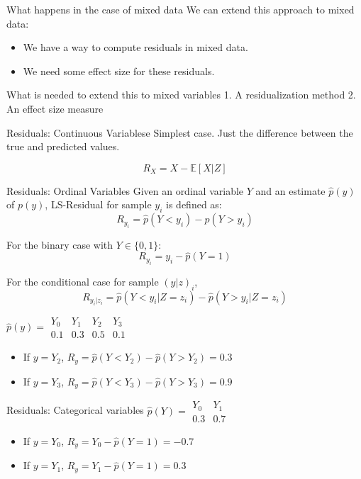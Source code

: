 \documentclass{beamer}
\begin{document}
\begin{frame}{What happens in the case of mixed data}
	We can extend this approach to mixed data:
	\begin{itemize}
		\item We have a way to compute residuals in mixed data.
		\item We need some effect size for these residuals.
	\end{itemize}
\end{frame}

\begin{frame}{What is needed to extend this to mixed variables}
	1. A residualization method
	2. An effect size measure
\end{frame}

\begin{frame}{Residuals: Continuous Variablese}
	Simplest case. Just the difference between the true and predicted values.

	$$ R_X = X - \mathbb{E}[X | Z] $$

\end{frame}

\begin{frame}{Residuals: Ordinal Variables}
	Given an ordinal variable $ Y $ and an estimate $ \hat{p}(y) $ of $
	p(y) $, LS-Residual for sample $ y_i $ is defined as:
	$$ R_{y_i} = \hat{p}(Y < y_i) - \hat{p}(Y > y_i) $$
	\vspace{1em}

	For the binary case with $ Y \in \{0, 1\} $:
	$$ R_{y_i} = y_i - \hat{p}(Y = 1) $$
	\vspace{1em}

	For the conditional case for sample $ (y|z)_i $,
	$$ R_{y_i | z_i} = \hat{p}(Y < y_i | Z=z_i) - \hat{p}(Y>y_i|Z=z_i) $$

	$ \hat{p}(y) = \begin{array}{llll} Y_0 & Y_1 & Y_2 & Y_3 \\ 0.1 & 0.3 & 0.5 & 0.1 \end{array} $
	\begin{itemize}
		\item If $ y = Y_2 $, $ R_{y} = \hat{p}(Y < Y_2) - \hat{p}(Y > Y_2) = 0.3 $
		\item If $ y = Y_3 $, $ R_{y} = \hat{p}(Y < Y_3) - \hat{p}(Y > Y_3) = 0.9 $
	\end{itemize}
\end{frame}

\begin{frame}{Residuals: Categorical variables}
	$\hat{p}(Y) = \begin{array}{ll} Y_0 & Y_1 \\ 0.3 & 0.7 \end{array} $
	\begin{itemize}	
		\item If $ y = Y_0 $, $ R_{y} = Y_0 - \hat{p}(Y=1) = -0.7 $
		\item If $ y = Y_1 $, $ R_{y} = Y_1 - \hat{p}(Y=1) = 0.3 $
	\end{itemize}
\end{frame}
\end{document}

